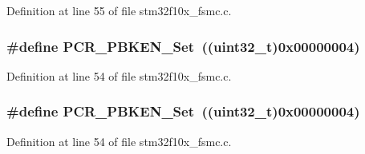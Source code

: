 Definition at line 55 of file stm32f10x\+\_\+fsmc.\+c.

\subsubsection[{\texorpdfstring{P\+C\+R\+\_\+\+P\+B\+K\+E\+N\+\_\+\+Set}{PCR_PBKEN_Set}}]{\setlength{\rightskip}{0pt plus 5cm}\#define P\+C\+R\+\_\+\+P\+B\+K\+E\+N\+\_\+\+Set~(({\bf uint32\+\_\+t})0x00000004)}\hypertarget{group___f_s_m_c___private___defines_gade871050f882b7f48582084b0e95f67c}{}\label{group___f_s_m_c___private___defines_gade871050f882b7f48582084b0e95f67c}


Definition at line 54 of file stm32f10x\+\_\+fsmc.\+c.

\subsubsection[{\texorpdfstring{P\+C\+R\+\_\+\+P\+B\+K\+E\+N\+\_\+\+Set}{PCR_PBKEN_Set}}]{\setlength{\rightskip}{0pt plus 5cm}\#define P\+C\+R\+\_\+\+P\+B\+K\+E\+N\+\_\+\+Set~(({\bf uint32\+\_\+t})0x00000004)}\hypertarget{group___f_s_m_c___private___defines_gade871050f882b7f48582084b0e95f67c}{}\label{group___f_s_m_c___private___defines_gade871050f882b7f48582084b0e95f67c}


Definition at line 54 of file stm32f10x\+\_\+fsmc.\+c.

